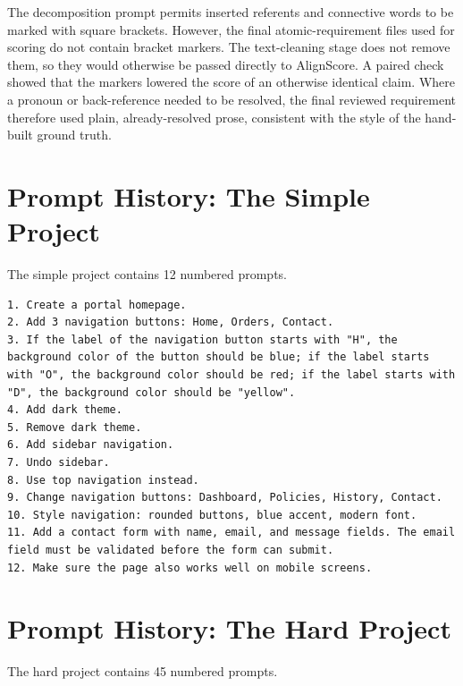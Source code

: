 The decomposition prompt permits inserted referents and connective words to be
marked with square brackets. However, the final atomic-requirement files used
for scoring do not contain bracket markers. The text-cleaning stage does not
remove them, so they would otherwise be passed directly to AlignScore. A
paired check showed that the markers lowered the score of an otherwise
identical claim. Where a pronoun or back-reference needed to be resolved, the
final reviewed requirement therefore used plain, already-resolved prose,
consistent with the style of the hand-built ground truth.

\section{Prompt History: The Simple Project}
\label{app:history-simple}

The simple project contains 12 numbered prompts.

\begin{lstlisting}[breaklines=true, basicstyle=\small\ttfamily]
1. Create a portal homepage.
2. Add 3 navigation buttons: Home, Orders, Contact.
3. If the label of the navigation button starts with "H", the background color of the button should be blue; if the label starts with "O", the background color should be red; if the label starts with "D", the background color should be "yellow".
4. Add dark theme.
5. Remove dark theme.
6. Add sidebar navigation.
7. Undo sidebar.
8. Use top navigation instead.
9. Change navigation buttons: Dashboard, Policies, History, Contact.
10. Style navigation: rounded buttons, blue accent, modern font.
11. Add a contact form with name, email, and message fields. The email field must be validated before the form can submit.
12. Make sure the page also works well on mobile screens.
\end{lstlisting}

\section{Prompt History: The Hard Project}
\label{app:history-erp}

The hard project contains 45 numbered prompts.

